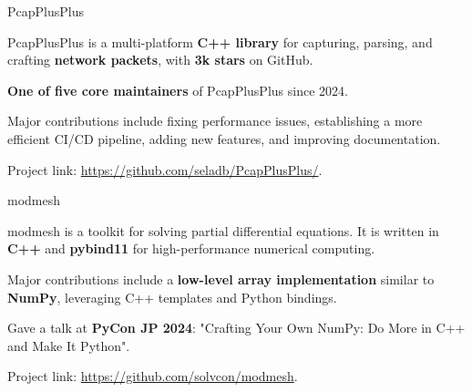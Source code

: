 
\vspace{-2mm}

\begin{cventries}

  \cventry
    {} %
    {PcapPlusPlus} %
    {} %
    {} %
    {
      \vspace{-3mm}
      \begin{cvitems} %
  \item {PcapPlusPlus is a multi-platform \textbf{C++ library} for capturing, parsing, and crafting \textbf{network packets}, with \textbf{3k stars} on GitHub.}
  \item {\textbf{One of five core maintainers} of PcapPlusPlus since 2024.}
  \item {Major contributions include fixing performance issues, establishing a more efficient CI/CD pipeline, adding new features, and improving documentation.}
        \item {Project link: \url{https://github.com/seladb/PcapPlusPlus/}.}
      \end{cvitems}
    }
    \vspace{2mm}

  \cventry
    {} %
    {modmesh} %
    {} %
    {} %
    {
      \vspace{-3mm}
      \begin{cvitems} %
  \item {modmesh is a toolkit for solving partial differential equations. It is written in \textbf{C++} and \textbf{pybind11} for high-performance numerical computing.}
  \item {Major contributions include a \textbf{low-level array implementation} similar to \textbf{NumPy}, leveraging C++ templates and Python bindings.}
  \item {Gave a talk at \textbf{PyCon JP 2024}: "Crafting Your Own NumPy: Do More in C++ and Make It Python".}
        \item {Project link: \url{https://github.com/solvcon/modmesh}.}
      \end{cvitems}
    }
    \vspace{2mm}


\end{cventries}
